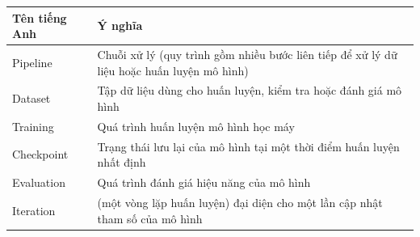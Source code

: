 \documentclass[../DoAn.tex]{subfiles}
\begin{document}
\begin{longtable}{l p{14cm}}
	\hline
   \textbf{Tên tiếng Anh}  & \textbf{Ý nghĩa} \\ \hline 
   
   Pipeline & Chuỗi xử lý (quy trình gồm nhiều bước liên tiếp để xử lý dữ liệu hoặc huấn luyện mô hình) \\

   Dataset & Tập dữ liệu dùng cho huấn luyện, kiểm tra hoặc đánh giá mô hình \\

   Training & Quá trình huấn luyện mô hình học máy \\

   Checkpoint & Trạng thái lưu lại của mô hình tại một thời điểm huấn luyện nhất định \\

   Evaluation & Quá trình đánh giá hiệu năng của mô hình \\

   Iteration & (một vòng lặp huấn luyện) đại diện cho một lần cập nhật tham số của mô hình \\


    \hline
\end{longtable}
\end{document}
